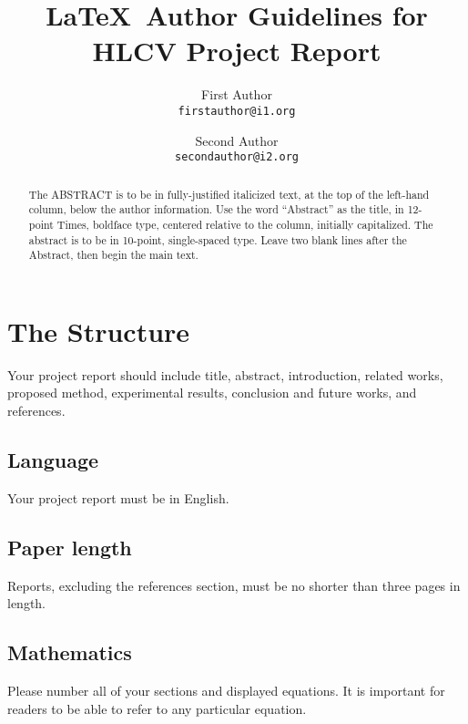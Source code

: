 \documentclass[10pt,twocolumn,letterpaper]{article}
\begin{document}
\title{\LaTeX\ Author Guidelines for HLCV Project Report}

\author{First Author\\
{\tt\small firstauthor@i1.org}
\and
Second Author\\
{\tt\small secondauthor@i2.org}
}

\maketitle

\begin{abstract}
   The ABSTRACT is to be in fully-justified italicized text, at the top
   of the left-hand column, below the author 
   information. Use the word ``Abstract'' as the title, in 12-point
   Times, boldface type, centered relative to the column, initially
   capitalized. The abstract is to be in 10-point, single-spaced type.
   Leave two blank lines after the Abstract, then begin the main text.
\end{abstract}

\section{The Structure}

Your project report should include title, abstract, introduction, related works, proposed method, experimental results, conclusion and future works, and references. 

\subsection{Language}

Your project report must be in English.


\subsection{Paper length}
Reports, excluding the references section,
must be no shorter than three pages in length.
 

\subsection{Mathematics}

Please number all of your sections and displayed equations.  It is
important for readers to be able to refer to any particular equation.  
\end{document}
